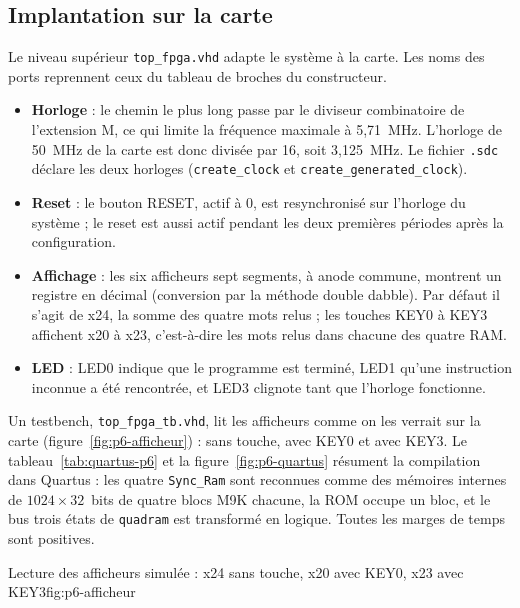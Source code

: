 \subsection{Implantation sur la carte}

Le niveau supérieur \texttt{top\_fpga.vhd} adapte le système à la carte. Les noms des ports
reprennent ceux du tableau de broches du constructeur.
\begin{itemize}
\item \textbf{Horloge} : le chemin le plus long passe par le diviseur combinatoire de
l'extension M, ce qui limite la fréquence maximale à 5,71~MHz. L'horloge de 50~MHz de la
carte est donc divisée par 16, soit 3,125~MHz. Le fichier \texttt{.sdc} déclare les deux
horloges (\texttt{create\_clock} et \texttt{create\_generated\_clock}).
\item \textbf{Reset} : le bouton RESET, actif à 0, est resynchronisé sur l'horloge du
système ; le reset est aussi actif pendant les deux premières périodes après la
configuration.
\item \textbf{Affichage} : les six afficheurs sept segments, à anode commune, montrent un
registre en décimal (conversion par la méthode \og double dabble\fg{}). Par défaut il s'agit
de x24, la somme des quatre mots relus ; les touches KEY0 à KEY3 affichent x20 à x23,
c'est-à-dire les mots relus dans chacune des quatre RAM.
\item \textbf{LED} : LED0 indique que le programme est terminé, LED1 qu'une instruction
inconnue a été rencontrée, et LED3 clignote tant que l'horloge fonctionne.
\end{itemize}

Un testbench, \texttt{top\_fpga\_tb.vhd}, lit les afficheurs comme on les verrait sur la
carte (figure~\ref{fig:p6-afficheur}) : \fg{} sans touche, \fg{} avec KEY0 et
\fg{} avec KEY3. Le tableau~\ref{tab:quartus-p6} et la figure~\ref{fig:p6-quartus}
résument la compilation dans Quartus :
les quatre \texttt{Sync\_Ram} sont reconnues comme des mémoires internes de
$1024\times32$~bits de quatre blocs M9K chacune, la ROM occupe un bloc, et le bus trois
états de \texttt{quadram} est transformé en logique. Toutes les marges de temps sont
positives.

{Lecture des afficheurs simulée : x24 sans touche, x20 avec KEY0, x23 avec KEY3}{fig:p6-afficheur}

